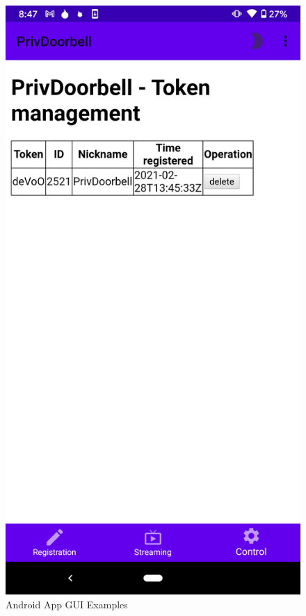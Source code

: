 \begin{figure}
\begin{minipage}[t]{0.3\linewidth}
		\includegraphics[width=\linewidth]{app_sc_token_revoke.png}
	\end{minipage}	
	\caption{Android App GUI Examples}
	\label{fig:app_sc}
\end{figure}


